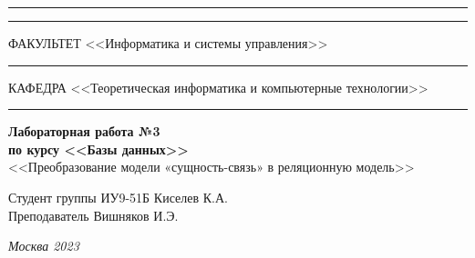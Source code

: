 \documentclass[a4paper, 14pt]{extarticle}
\begin{document}
\begin{titlepage}
\vspace{-25pt}
\hspace{-35pt}\rule{\textwidth}{2.3pt}

\vspace*{-20.3pt}
\hspace{-35pt}\rule{\textwidth}{0.4pt}

\vspace{1.5ex}
\hspace{-35pt} \noindent \small ФАКУЛЬТЕТ\hspace{80pt} <<Информатика и системы управления>>

\vspace*{-16pt}
\hspace{47pt}\rule{0.83\textwidth}{0.4pt}

\vspace{0.5ex}
\hspace{-35pt} \noindent \small КАФЕДРА\hspace{50pt} <<Теоретическая информатика и компьютерные технологии>>

\vspace*{-16pt}
\hspace{30pt}\rule{0.866\textwidth}{0.4pt}
  
\vspace{11em}

\begin{center}
\Large {\bf Лабораторная работа №3} \\ 
\large {\bf по курсу <<Базы данных>>} \\

\large <<Преобразование модели «сущность-связь» в реляционную модель>> \\
\end{center}\normalsize

\vspace{8em}


\begin{flushright}
  {Студент группы ИУ9-51Б Киселев К.А. \hspace*{15pt}\\ 
  \vspace{2ex}
  Преподаватель Вишняков И.Э. \hspace*{15pt}}
\end{flushright}

\bigskip

\vfill
 

\begin{center}
\textsl{Москва 2023}
\end{center}
\end{titlepage}
\end{document}
